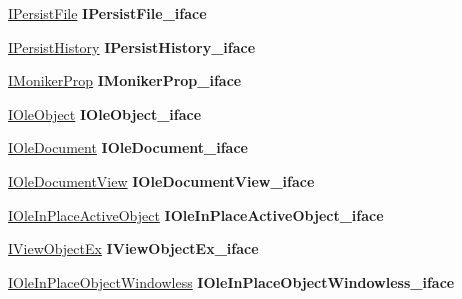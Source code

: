 \begin{DoxyCompactItemize}
\hyperlink{interface_i_persist_file}{I\+Persist\+File} {\bfseries I\+Persist\+File\+\_\+iface}
\item 
\mbox{\label{struct_h_t_m_l_document_a0d8918de7b820116f2b454e75f774804}} 
\hyperlink{interface_i_persist_history}{I\+Persist\+History} {\bfseries I\+Persist\+History\+\_\+iface}
\item 
\mbox{\label{struct_h_t_m_l_document_a904727cb71be92d3afdd587d6f79b943}} 
\hyperlink{interface_i_moniker_prop}{I\+Moniker\+Prop} {\bfseries I\+Moniker\+Prop\+\_\+iface}
\item 
\mbox{\label{struct_h_t_m_l_document_a30574a5c3713f013a8f23376f92e36e0}} 
\hyperlink{interface_i_ole_object}{I\+Ole\+Object} {\bfseries I\+Ole\+Object\+\_\+iface}
\item 
\mbox{\label{struct_h_t_m_l_document_ac8fffaf4781285e63b943a2682ec711a}} 
\hyperlink{interface_i_ole_document}{I\+Ole\+Document} {\bfseries I\+Ole\+Document\+\_\+iface}
\item 
\mbox{\label{struct_h_t_m_l_document_ae62d91954c22082a946dec5a58b67af0}} 
\hyperlink{interface_i_ole_document_view}{I\+Ole\+Document\+View} {\bfseries I\+Ole\+Document\+View\+\_\+iface}
\item 
\mbox{\label{struct_h_t_m_l_document_a924a7e5299798693881027e544ac8207}} 
\hyperlink{interface_i_ole_in_place_active_object}{I\+Ole\+In\+Place\+Active\+Object} {\bfseries I\+Ole\+In\+Place\+Active\+Object\+\_\+iface}
\item 
\mbox{\label{struct_h_t_m_l_document_a98eb9eef6d4985b585af6c7c25d50e91}} 
\hyperlink{interface_i_view_object_ex}{I\+View\+Object\+Ex} {\bfseries I\+View\+Object\+Ex\+\_\+iface}
\item 
\mbox{\label{struct_h_t_m_l_document_a19794bc268dc04f7482a3703e990ba74}} 
\hyperlink{interface_i_ole_in_place_object_windowless}{I\+Ole\+In\+Place\+Object\+Windowless} {\bfseries I\+Ole\+In\+Place\+Object\+Windowless\+\_\+iface}
\item 
\mbox{\label{struct_h_t_m_l_document_abc7533b5850de806ee90ff89729a805d}} 

\end{DoxyCompactItemize}

